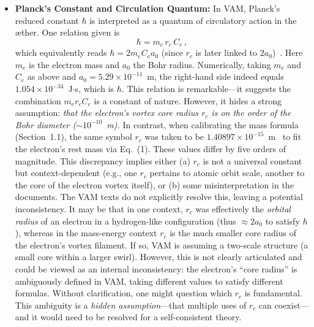 \documentclass[a4paper,12pt]{article}
\begin{document}
\begin{itemize}
\item 
\textbf{Planck's Constant and Circulation Quantum:} In VAM, Planck's reduced constant $\hbar$ is interpreted as a quantum of circulatory action in the æther. One relation given is
\begin{equation}
    \hbar = m_e\, r_c\, C_e\,,
\end{equation}
which equivalently reads $\hbar = 2 m_e C_e a_0$ (since $r_c$ is later linked to $2a_0$)~\cite{vamcore}. Here $m_e$ is the electron mass and $a_0$ the Bohr radius. Numerically, taking $m_e$ and $C_e$ as above and $a_0=5.29\times10^{-11}$~m, the right-hand side indeed equals $1.054\times10^{-34}$~J$\cdot$s, which is $\hbar$. This relation is remarkable---it suggests the combination $m_e r_c C_e$ is a constant of nature. However, it hides a strong assumption: \textit{that the electron's vortex core radius $r_c$ is on the order of the Bohr diameter ($\sim10^{-10}$~m).} In contrast, when calibrating the mass formula (Section~1.1), the same symbol $r_c$ was taken to be $1.40897\times10^{-15}$~m~\cite{vamfit} to fit the electron's rest mass via Eq.~(1). These values differ by five orders of magnitude. This discrepancy implies either (a) $r_c$ is not a universal constant but context-dependent (e.g., one $r_c$ pertains to atomic orbit scale, another to the core of the electron vortex itself), or (b) some misinterpretation in the documents. The VAM texts do not explicitly resolve this, leaving a potential inconsistency. It may be that in one context, $r_c$ was effectively the \textit{orbital radius} of an electron in a hydrogen-like configuration (thus $\approx 2a_0$ to satisfy $\hbar$), whereas in the mass-energy context $r_c$ is the much smaller core radius of the electron's vortex filament. If so, VAM is assuming a two-scale structure (a small core within a larger swirl). However, this is not clearly articulated and could be viewed as an internal inconsistency: the electron's ``core radius'' is ambiguously defined in VAM, taking different values to satisfy different formulas. Without clarification, one might question which $r_c$ is fundamental. This ambiguity is a \textit{hidden assumption}---that multiple uses of $r_c$ can coexist---and it would need to be resolved for a self-consistent theory.


\end{itemize}
\end{document}
